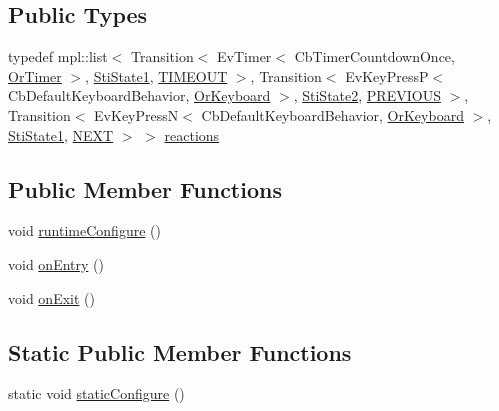 \subsection*{Public Types}
\begin{DoxyCompactItemize}
\item 
typedef mpl\+::list$<$ Transition$<$ Ev\+Timer$<$ Cb\+Timer\+Countdown\+Once, \hyperlink{classsm__three__some_1_1OrTimer}{Or\+Timer} $>$, \hyperlink{structsm__three__some_1_1inner__states_1_1StiState1}{Sti\+State1}, \hyperlink{structsm__three__some_1_1inner__states_1_1StiState3_1_1TIMEOUT}{T\+I\+M\+E\+O\+UT} $>$, Transition$<$ Ev\+Key\+PressP$<$ Cb\+Default\+Keyboard\+Behavior, \hyperlink{classsm__three__some_1_1OrKeyboard}{Or\+Keyboard} $>$, \hyperlink{structsm__three__some_1_1inner__states_1_1StiState2}{Sti\+State2}, \hyperlink{structsm__three__some_1_1inner__states_1_1StiState3_1_1PREVIOUS}{P\+R\+E\+V\+I\+O\+US} $>$, Transition$<$ Ev\+Key\+PressN$<$ Cb\+Default\+Keyboard\+Behavior, \hyperlink{classsm__three__some_1_1OrKeyboard}{Or\+Keyboard} $>$, \hyperlink{structsm__three__some_1_1inner__states_1_1StiState1}{Sti\+State1}, \hyperlink{structsm__three__some_1_1inner__states_1_1StiState3_1_1NEXT}{N\+E\+XT} $>$ $>$ \hyperlink{structsm__three__some_1_1inner__states_1_1StiState3_a3c00d8e30a1a01b0783e9dfcf57bfd25}{reactions}
\end{DoxyCompactItemize}
\subsection*{Public Member Functions}
\begin{DoxyCompactItemize}
\item 
void \hyperlink{structsm__three__some_1_1inner__states_1_1StiState3_aec16c13bf440af18f898274110e97786}{runtime\+Configure} ()
\item 
void \hyperlink{structsm__three__some_1_1inner__states_1_1StiState3_a64fda2ad984526eef1039eb21296a939}{on\+Entry} ()
\item 
void \hyperlink{structsm__three__some_1_1inner__states_1_1StiState3_a52bd074c6e2ca2aeaded85f97ca593d4}{on\+Exit} ()
\end{DoxyCompactItemize}
\subsection*{Static Public Member Functions}
\begin{DoxyCompactItemize}
\item 
static void \hyperlink{structsm__three__some_1_1inner__states_1_1StiState3_a029d93f83c53d16ac347d908dbe87cc2}{static\+Configure} ()
\end{DoxyCompactItemize}
